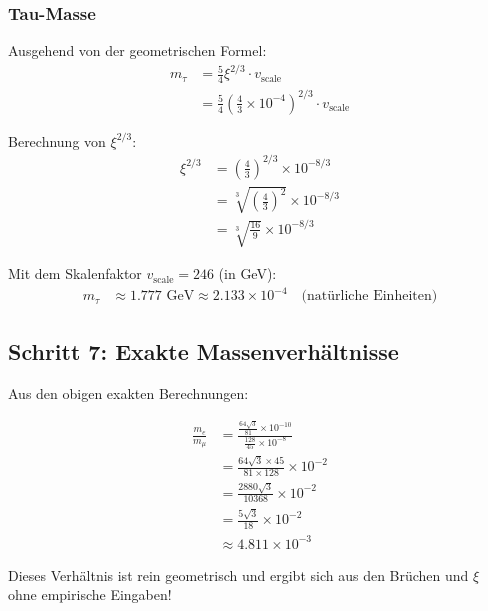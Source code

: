 \documentclass[12pt,a4paper]{article}
\newcommand{\xipar}{\xi}
\begin{document}
	\subsubsection{Tau-Masse}
	
	\begin{keyresult}
		Ausgehend von der geometrischen Formel:
		\begin{align}
			m_\tau &= \frac{5}{4} \xipar^{2/3} \cdot v_{\text{scale}} \\
			&= \frac{5}{4} \left(\frac{4}{3} \times 10^{-4}\right)^{2/3} \cdot v_{\text{scale}}
		\end{align}
		
		Berechnung von $\xipar^{2/3}$:
		\begin{align}
			\xipar^{2/3} &= \left(\frac{4}{3}\right)^{2/3} \times 10^{-8/3} \\
			&= \sqrt[3]{\left(\frac{4}{3}\right)^2} \times 10^{-8/3} \\
			&= \sqrt[3]{\frac{16}{9}} \times 10^{-8/3}
		\end{align}
		
		Mit dem Skalenfaktor $v_{\text{scale}} = 246$ (in GeV):
		\begin{align}
			m_\tau &\approx 1.777 \text{ GeV} \approx 2.133 \times 10^{-4} \quad \text{(natürliche Einheiten)}
		\end{align}
	\end{keyresult}
	
	\subsection{Schritt 7: Exakte Massenverhältnisse}
	
	Aus den obigen exakten Berechnungen:
	
	\begin{keyresult}
		\begin{align}
			\frac{m_e}{m_\mu} &= \frac{\frac{64\sqrt{3}}{81} \times 10^{-10}}{\frac{128}{45} \times 10^{-8}} \\
			&= \frac{64\sqrt{3} \times 45}{81 \times 128} \times 10^{-2} \\
			&= \frac{2880\sqrt{3}}{10368} \times 10^{-2} \\
			&= \frac{5\sqrt{3}}{18} \times 10^{-2} \\
			&\approx 4.811 \times 10^{-3}
		\end{align}
		
		Dieses Verhältnis ist rein geometrisch und ergibt sich aus den Brüchen und $\xipar$ ohne empirische Eingaben!
	\end{keyresult}
	
\end{document}
